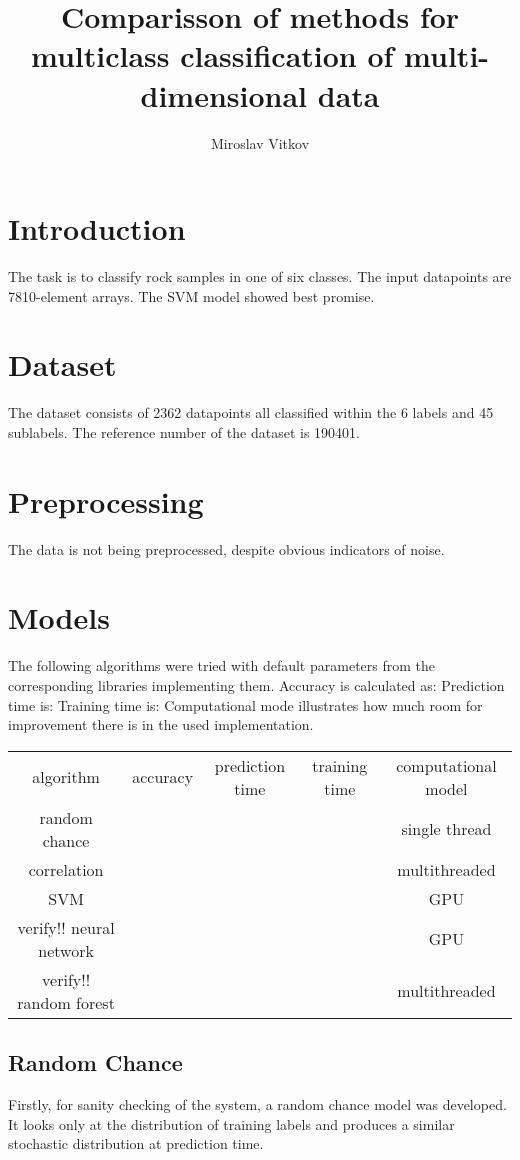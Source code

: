 \documentclass{article}
\title{Comparisson of methods for multiclass classification of multi-dimensional data}
\author{Miroslav Vitkov}
\begin{document}
\maketitle

\section{Introduction}
The task is to classify rock samples in one of six classes.
The input datapoints are 7810-element arrays.
The SVM model showed best promise.


\section{Dataset}
The dataset consists of 2362 datapoints all classified within the 6 labels and 45 sublabels.
The reference number of the dataset is 190401.


\section{Preprocessing}
The data is not being preprocessed, despite obvious indicators of noise.


\section{Models}
The following algorithms were tried with default parameters from the corresponding libraries implementing them.
Accuracy is calculated as:
Prediction time is:
Training time is:
Computational mode illustrates how much room for improvement there is in the used implementation.
\\ \par
{}
\begin{tabular}{ c | c | c | c | c }
algorithm      & accuracy & prediction time & training time & computational model \\
random chance  & & & & single thread \\
correlation    & & & & multithreaded \\
SVM            & & & & GPU \\ verify!!
neural network & & & & GPU \\  verify!!
random forest  & & & & multithreaded \\
\end{tabular}


\subsection{Random Chance}
Firstly, for sanity checking of the system, a random chance model was developed.
It looks only at the distribution of training labels and produces a similar stochastic distribution at prediction time.
\end{document}
